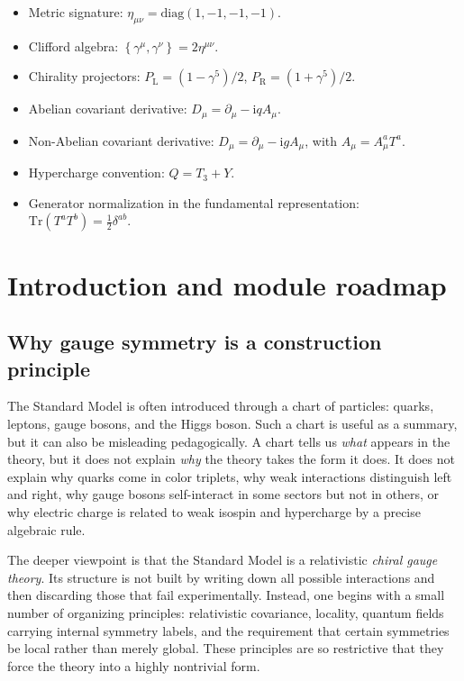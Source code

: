 \documentclass[11pt,a4paper]{article}
\newcommand{\ii}{\mathrm{i}}
\newcommand{\p}{\partial}
\newcommand{\Tr}{\mathrm{Tr}}
\newcommand{\diag}{\mathrm{diag}}
\newcommand{\acomm}[2]{\left\{#1,#2\right\}}
\newcommand{\half}{\tfrac12}
\newcommand{\gfive}{\gamma^5}
\newcommand{\PL}{P_{\mathrm{L}}}
\newcommand{\PR}{P_{\mathrm{R}}}
\newcommand{\Qop}{Q}
\newcommand{\Tthree}{T_3}
\newcommand{\Yop}{Y}
\begin{document}
\begin{itemize}[leftmargin=1.7em]
\item Metric signature: \(\eta_{\mu\nu}=\diag(1,-1,-1,-1)\).
\item Clifford algebra: \(\acomm{\gamma^\mu}{\gamma^\nu}=2\eta^{\mu\nu}\).
\item Chirality projectors: \(\PL=(1-\gfive)/2\), \(\PR=(1+\gfive)/2\).
\item Abelian covariant derivative: \(D_\mu=\p_\mu-\ii q A_\mu\).
\item Non-Abelian covariant derivative: \(D_\mu=\p_\mu-\ii g A_\mu\), with \(A_\mu=A_\mu^a T^a\).
\item Hypercharge convention: \(\Qop=\Tthree+\Yop\).
\item Generator normalization in the fundamental representation: \(\Tr(T^aT^b)=\half\delta^{ab}\).
\end{itemize}



\newpage




\section{Introduction and module roadmap}

\subsection{Why gauge symmetry is a construction principle}

The Standard Model is often introduced through a chart of particles: quarks, leptons, gauge bosons, and the Higgs boson. Such a chart is useful as a summary, but it can also be misleading pedagogically. A chart tells us \emph{what} appears in the theory, but it does not explain \emph{why} the theory takes the form it does. It does not explain why quarks come in color triplets, why weak interactions distinguish left and right, why gauge bosons self-interact in some sectors but not in others, or why electric charge is related to weak isospin and hypercharge by a precise algebraic rule.

The deeper viewpoint is that the Standard Model is a relativistic \emph{chiral gauge theory}. Its structure is not built by writing down all possible interactions and then discarding those that fail experimentally. Instead, one begins with a small number of organizing principles: relativistic covariance, locality, quantum fields carrying internal symmetry labels, and the requirement that certain symmetries be local rather than merely global. These principles are so restrictive that they force the theory into a highly nontrivial form.
\end{document}
